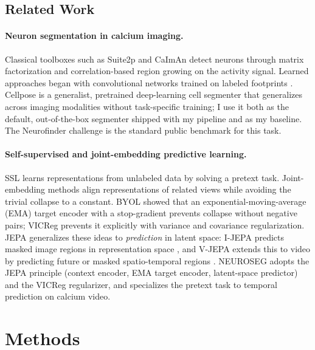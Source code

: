 \documentclass[twoside,11pt]{article}
\begin{document}
\subsection{Related Work}
\label{sec:related}

\paragraph{Neuron segmentation in calcium imaging.} Classical toolboxes such as Suite2p
\citep{pachitariu2017suite2p} and CaImAn \citep{giovannucci2019caiman} detect neurons through matrix
factorization and correlation-based region growing on the activity signal. Learned approaches began
with convolutional networks trained on labeled footprints \citep{apthorpe2016automatic}. Cellpose
\citep{stringer2021cellpose} is a generalist, pretrained deep-learning cell segmenter that
generalizes across imaging modalities without task-specific training; I use it both as the default,
out-of-the-box segmenter shipped with my pipeline and as my baseline. The Neurofinder challenge
\citep{neurofinder} is the standard public benchmark for this task.

\paragraph{Self-supervised and joint-embedding predictive learning.} SSL learns representations from
unlabeled data by solving a pretext task. Joint-embedding methods align representations of related
views while avoiding the trivial collapse to a constant. BYOL \citep{grill2020byol} showed that an
exponential-moving-average (EMA) target encoder with a stop-gradient prevents collapse without
negative pairs; VICReg \citep{bardes2022vicreg} prevents it explicitly with variance and covariance
regularization. JEPA \citep{lecun2022path} generalizes these ideas to \emph{prediction} in latent
space: I-JEPA predicts masked image regions in representation space \citep{assran2023ijepa}, and
V-JEPA extends this to video by predicting future or masked spatio-temporal regions
\citep{bardes2024vjepa}. NEUROSEG adopts the JEPA principle (context encoder, EMA target encoder,
latent-space predictor) and the VICReg regularizer, and specializes the pretext task to temporal
prediction on calcium video.

\section{Methods}
\label{sec:methods}
\end{document}
